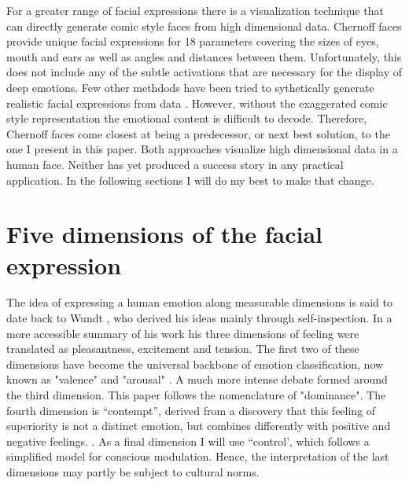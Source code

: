 \documentclass[conference]{IEEEtran}
\begin{document}
For a greater range of facial expressions there is a visualization technique that can directly generate comic style
faces from high dimensional data.
Chernoff faces provide unique facial expressions for 18 parameters covering the
sizes of eyes, mouth and ears as well as angles and distances between them\cite{chernoff}.
Unfortunately, this does not include any of the subtle activations that are necessary for the display of deep emotions.
Few other methdods have been tried to sythetically generate realistic facial expressions from
data \cite{parametric_face_drawings, parametric_faces, parametric_face_facs, FACSGen}.
However, without the exaggerated comic style representation the emotional content is difficult to decode.
Therefore, Chernoff faces come closest at being a predecessor, or next best solution, to the one I present in this paper.
Both approaches visualize high dimensional data in a human face. Neither has yet produced a success story in any
practical application. In the following sections I will do my best to make that change.

\section{Five dimensions of the facial expression}
The idea of expressing a human emotion along measurable dimensions is said to date back to Wundt \cite{wundt}, who derived
his ideas mainly through self-inspection.
In a more accessible summary of his work his three dimensions of feeling were translated as pleasantness, excitement and tension\cite{tridimensional}.
The first two of these dimensions have become the universal backbone of emotion classification,
now known as "valence" and "arousal" \cite{circumplex}.
A much more intense debate formed around the third dimension. This paper follows the nomenclature of "dominance"\cite{dominance_mehrabian}.
The fourth dimension is ``contempt'', derived from a discovery that this feeling of superiority is not a distinct emotion, but combines differently with positive and negative feelings. \cite{contempt_ekman}.
As a final dimension I will use ``control', which follows a simplified model for conscious modulation.
Hence, the interpretation of the last dimensions may partly be subject to cultural norms.
\end{document}
